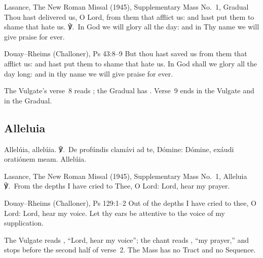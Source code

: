 \begin{englishwitness}{Lasance, The New Roman Missal (1945), Supplementary Mass No.~1, Gradual}
Thou hast delivered us, O Lord, from them that afflict us: and hast put them
to shame that hate us. ℣.~In God we will glory all the day: and in Thy name we
will give praise for ever.
\end{englishwitness}

\begin{englishwitness}{Douay--Rheims (Challoner), Ps 43:8--9}
But thou hast saved us from them that afflict us: and hast put them to shame
that hate us. In God shall we glory all the day long: and in thy name we will
give praise for ever.
\end{englishwitness}

\noindent The Vulgate's verse~8 reads ; the Gradual has . Verse~9 ends
 in the Vulgate and  in the Gradual.

\subsection{Alleluia}
\label{proper-alleluia}


\begin{latinproper}
Allelúia, allelúia. ℣.~De profúndis clamávi ad te, Dómine: Dómine, exáudi
oratiónem meam. Allelúia.
\end{latinproper}

\begin{englishwitness}{Lasance, The New Roman Missal (1945), Supplementary Mass No.~1, Alleluia}
℣.~From the depths I have cried to Thee, O Lord: Lord, hear my prayer.
\end{englishwitness}

\begin{englishwitness}{Douay--Rheims (Challoner), Ps 129:1--2}
Out of the depths I have cried to thee, O Lord: Lord, hear my voice. Let thy
ears be attentive to the voice of my supplication.
\end{englishwitness}

\noindent The Vulgate reads , ``Lord, hear my
voice''; the chant reads , ``my prayer,'' and stops
before the second half of verse~2. The Mass has no Tract and no Sequence.

